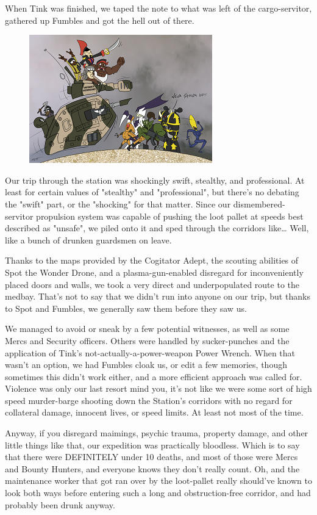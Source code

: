 When Tink was finished, we taped the note to what was left of the cargo-servitor, gathered up Fumbles and got the hell out of there.

\begin{figure}
	\begin{center}
		\includegraphics[width=\figwidth]{pics/14/30.png}
	\end{center}
\end{figure}
Our trip through the station was shockingly swift, stealthy, and professional. 
At least for certain values of "stealthy" and "professional", but there's no debating the "swift" part, or the "shocking" for that matter. 
Since our dismembered-servitor propulsion system was capable of pushing the loot pallet at speeds best described as "unsafe", we piled onto it and sped through the corridors like… Well, like a bunch of drunken guardsmen on leave.

Thanks to the maps provided by the Cogitator Adept, the scouting abilities of Spot the Wonder Drone, and a plasma-gun-enabled disregard for inconveniently placed doors and walls, we took a very direct and underpopulated route to the medbay. 
That's not to say that we didn't run into anyone on our trip, but thanks to Spot and Fumbles, we generally saw them before they saw us. 


We managed to avoid or sneak by a few potential witnesses, as well as some Mercs and Security officers. 
Others were handled by sucker-punches and the application of Tink's not-actually-a-power-weapon Power Wrench. 
When that wasn't an option, we had Fumbles cloak us, or edit a few memories, though sometimes this didn't work either, and a more efficient approach was called for. 
Violence was only our last resort mind you, it's not like we were some sort of high speed murder-barge shooting down the Station's corridors with no regard for collateral damage, innocent lives, or speed limits. 
At least not most of the time.

Anyway, if you disregard maimings, psychic trauma, property damage, and other little things like that, our expedition was practically bloodless. 
Which is to say that there were DEFINITELY under 10 deaths, and most of those were Mercs and Bounty Hunters, and everyone knows they don't really count. 
Oh, and the maintenance worker that got ran over by the loot-pallet really should've known to look both ways before entering such a long and obstruction-free corridor, and had probably been drunk anyway.

